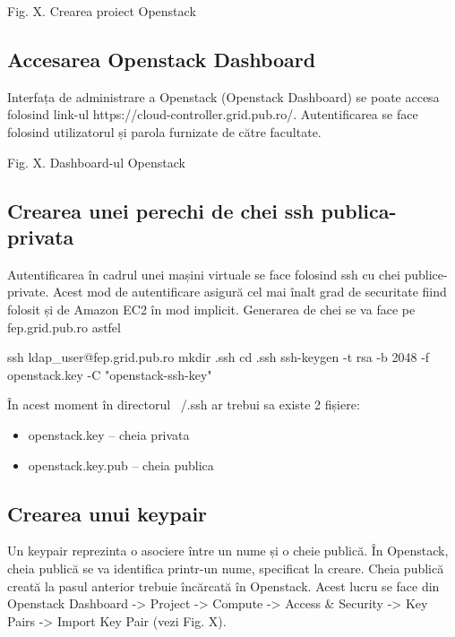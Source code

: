 Fig. X. Crearea proiect Openstack

\subsection{Accesarea Openstack Dashboard}
\label{sec:vm-openstack-dashboard}

Interfața de administrare a Openstack (Openstack Dashboard) se poate accesa
folosind link-ul https://cloud-controller.grid.pub.ro/. Autentificarea se face
folosind utilizatorul și parola furnizate de către facultate.

Fig. X. Dashboard-ul Openstack

\subsection{Crearea unei perechi de chei ssh publica-privata}
\label{sec:vm-openstack-keys}

Autentificarea în cadrul unei mașini virtuale se face folosind ssh cu chei
publice-private. Acest mod de autentificare asigură cel mai înalt grad de
securitate fiind folosit și de Amazon EC2 în mod implicit. Generarea de chei se
va face pe fep.grid.pub.ro astfel

\begin{screen}
ssh ldap_user@fep.grid.pub.ro
mkdir .ssh
cd .ssh
ssh-keygen -t rsa -b 2048 -f openstack.key -C "openstack-ssh-key"
\end{screen}

În acest moment în directorul ~/.ssh ar trebui sa existe 2 fișiere:

\begin{itemize}
	\item openstack.key -- cheia privata
	\item openstack.key.pub -- cheia publica
\end{itemize}

\subsection{Crearea unui keypair}
\label{sec:vm-openstack-keypares}

Un keypair reprezinta o asociere între un nume și o cheie publică. În Openstack,
cheia publică se va identifica printr-un nume, specificat la creare. Cheia
publică creată la pasul anterior trebuie încărcată în Openstack. Acest lucru se
face din Openstack Dashboard -> Project -> Compute -> Access \& Security -> Key
Pairs -> Import Key Pair (vezi Fig. X).

